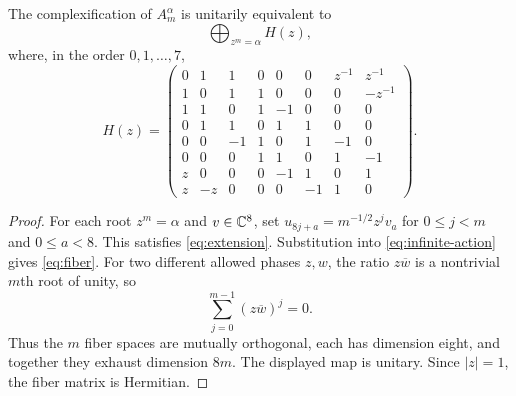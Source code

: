 \begin{lemma}\label{lem:bloch}
The complexification of $A_m^\alpha$ is unitarily equivalent to
\[
 \bigoplus_{z^m=\alpha}H(z),
\]
where, in the order $0,1,\ldots,7$,
\begin{equation}
 H(z)=\begin{pmatrix}
0&1&1&0&0&0&z^{-1}&z^{-1}\\
1&0&1&1&0&0&0&-z^{-1}\\
1&1&0&1&-1&0&0&0\\
0&1&1&0&1&1&0&0\\
0&0&-1&1&0&1&-1&0\\
0&0&0&1&1&0&1&-1\\
z&0&0&0&-1&1&0&1\\
z&-z&0&0&0&-1&1&0
\end{pmatrix}.
\label{eq:fiber}
\end{equation}
\end{lemma}
\begin{proof}
For each root $z^m=\alpha$ and $v\in\mathbb C^8$, set
$u_{8j+a}=m^{-1/2}z^jv_a$ for $0\le j<m$ and $0\le a<8$.
This satisfies \eqref{eq:extension}. Substitution into
\eqref{eq:infinite-action} gives \eqref{eq:fiber}. For two different
allowed phases $z,w$, the ratio $z\overline w$ is a nontrivial $m$th
root of unity, so
\[
 \sum_{j=0}^{m-1}(z\overline w)^j=0.
\]
Thus the $m$ fiber spaces are mutually orthogonal, each has dimension
eight, and together they exhaust dimension $8m$. The displayed map is
unitary. Since $|z|=1$, the fiber matrix is Hermitian.
\end{proof}

